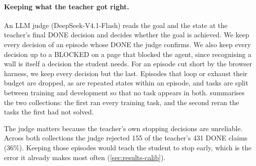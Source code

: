 \documentclass{article}
\begin{document}
\paragraph{Keeping what the teacher got right.} An LLM judge (DeepSeek-V4.1-Flash) reads the goal and the state at the
teacher's final DONE decision and decides whether the goal is achieved. We keep every decision of an episode whose DONE
the judge confirms. We also keep every decision up to a BLOCKED on a page that blocked the agent, since recognising a
wall is itself a decision the student needs. For an episode cut short by the browser harness, we keep every decision
but the last. Episodes that loop or exhaust their budget are dropped, as are repeated states within an episode, and
tasks are split between training and development so that no task appears in both.  summarises the
two collections: the first ran every training task, and the second reran the tasks the first had not solved.

The judge matters because the teacher's own stopping decisions are unreliable. Across both collections the judge
rejected 155 of the teacher's 431 DONE claims (36\%). Keeping those episodes would teach the student to stop early, which is the
error it already makes most often (\cref{sec:results-calib}).

\begin{table}[t]
\centering
\caption{Episodes of the two teacher collections by outcome, and the decisions kept for training and development.}
\label{tab:teacher}
\end{table}
\end{document}

